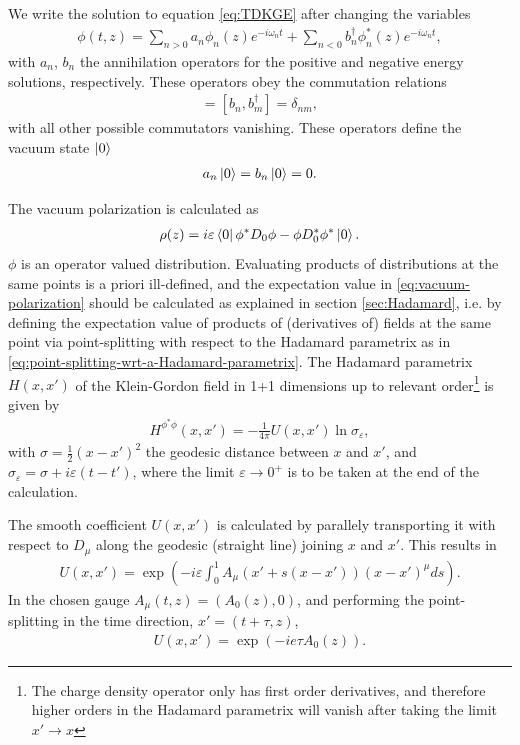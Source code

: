 		We write the solution to equation \eqref{eq:TDKGE} after changing the variables
		\begin{align}
			\phi(t, z) = \sum_{n>0}^{} a_n \phi_n(z) e^{-i\omega_n t} + \sum_{n<0}^{} b_n^\dagger \phi_n^*(z) e^{-i\omega_n t},
			\label{eq:field-expansion}
		\end{align}
		with $a_n$, $b_n$ the annihilation operators for the positive and negative energy solutions, respectively. These operators obey the commutation relations 
		\begin{align}
			[a_n, a_m^\dagger] =
			[b_n, b_m^\dagger] = \delta_{nm},
		\end{align}
		with all other possible commutators vanishing. These operators define the vacuum state $\ket{0} $ 
		\begin{align}
			a_n \ket{0} = b_n \ket{0} = 0.
		\end{align}

		The vacuum polarization is calculated as
		\begin{align}
			\rho(z) = i\varepsilon \bra{0} \phi^* D_0\phi - \phi D_0^* \phi^* \ket{0}.
			\label{eq:vacuum-polarization}
		\end{align}
		$\phi$ is an operator valued distribution.
		Evaluating products of distributions at the same points is a priori ill-defined, and the expectation value in \eqref{eq:vacuum-polarization}  should be calculated as explained in section \ref{sec:Hadamard}, i.e. by defining the expectation value of products of (derivatives of) fields at the same point via point-splitting with respect to the Hadamard parametrix as in \eqref{eq:point-splitting-wrt-a-Hadamard-parametrix}.
		The Hadamard parametrix $H(x, x') $ of the Klein-Gordon field in 1+1 dimensions up to relevant order\footnote{The charge density operator only has first order derivatives, and therefore higher orders in the Hadamard parametrix will vanish after taking the limit $x'\to x$ } is given by
		\begin{align}
			H^{\phi^* \phi}(x, x') = -\frac{1}{4\pi}U(x, x') \ln \sigma_\varepsilon,
		\end{align}
	with $\sigma = \frac{1}{2}(x - x')^2$ the geodesic distance between $x$ and $x'$, and $\sigma_\varepsilon = \sigma + i \varepsilon (t-t')$, where the limit $\varepsilon\to 0^+$ is to be taken at the end of the calculation.

	The smooth coefficient $U(x, x')$  is calculated by parallely transporting it with respect to $D_\mu$ along the geodesic (straight line) joining $x$ and $x'$. This results in 
	\begin{align}
		U(x, x') = \exp \left( -i\varepsilon \int_{0}^{1} A_\mu(x' + s(x-x')) \left( x- x' \right) ^{ \mu} ds  \right) .
	\end{align}
	In the chosen gauge $A_\mu(t, z) = (A_0(z), 0)$, and performing the point-splitting in the time direction, $x' =  (t+\tau, z)$, 
	\begin{align}
	U(x, x') = \exp\left( -ie\tau A_0(z) \right).
	\end{align}


